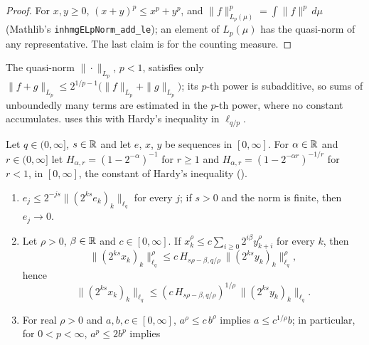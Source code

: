 \begin{proof}
\leanok
For $x, y \geq 0$, $(x + y)^p \leq x^p + y^p$, and $\|f\|_{L_p(\mu)}^p = \int \|f\|^p \, d\mu$
(Mathlib's \texttt{inhmgELpNorm\_\allowbreak add\_\allowbreak le}); an element of $L_p(\mu)$ has
the quasi-norm of any representative. The last claim is  for the
counting measure.
\end{proof}

The quasi-norm $\|\cdot\|_{L_p}$, $p < 1$, satisfies only
$\|f + g\|_{L_p} \leq 2^{1/p - 1} \bigl(\|f\|_{L_p} + \|g\|_{L_p}\bigr)$; its $p$-th power is
subadditive, so sums of unboundedly many terms are estimated in the $p$-th power, where no
constant accumulates.  uses this with Hardy's inequality in $\ell_{q/p}$.

\begin{lemma}
\label{lem:weighted-tails}
\leanok
{}
Let $q \in (0, \infty]$, $s \in \mathbb{R}$ and let $e$, $x$, $y$ be sequences in $[0, \infty]$. For
$\alpha \in \mathbb{R}$ and $r \in (0, \infty]$ let $H_{\alpha, r} = (1 - 2^{-\alpha})^{-1}$ for $r \geq 1$
and $H_{\alpha, r} = (1 - 2^{-\alpha r})^{-1/r}$ for $r < 1$, in $[0, \infty]$, the constant of
Hardy's inequality ().
\begin{enumerate}
  \item $e_j \leq 2^{-js} \|(2^{ks} e_k)_k\|_{\ell_q}$ for every $j$; if $s > 0$ and the norm is
    finite, then $e_j \to 0$.
  \item Let $\rho > 0$, $\beta \in \mathbb{R}$ and $c \in [0, \infty]$. If
    $x_k^\rho \leq c \sum_{i \geq 0} 2^{i\beta} y_{k+i}^\rho$ for every $k$, then
    \[
      \|(2^{ks} x_k)_k\|_{\ell_q}^\rho \leq c \, H_{s\rho - \beta, q/\rho} \,
      \|(2^{ks} y_k)_k\|_{\ell_q}^\rho ,
    \]
    hence
    \[
      \|(2^{ks} x_k)_k\|_{\ell_q} \leq (c \, H_{s\rho - \beta, q/\rho})^{1/\rho} \,
      \|(2^{ks} y_k)_k\|_{\ell_q} .
    \]
  \item For real $\rho > 0$ and $a, b, c \in [0, \infty]$, $a^\rho \leq c \, b^\rho$ implies
    $a \leq c^{1/\rho} b$; in particular, for $0 < p < \infty$, $a^p \leq 2 b^p$ implies

\end{enumerate}
\end{lemma}
